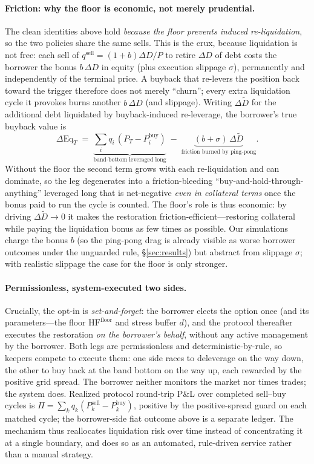\documentclass[12pt]{article}
\begin{document}
\paragraph{Friction: why the floor is economic, not merely prudential.} The clean identities above hold \emph{because the floor prevents induced re-liquidation}, so the two policies share the same sells. This is the crux, because liquidation is not free: each sell of $q^{\text{sell}}=(1+b)\Delta D/P$ to retire $\Delta D$ of debt costs the borrower the bonus $b\,\Delta D$ in equity (plus execution slippage $\sigma$), permanently and independently of the terminal price. A buyback that re-levers the position back toward the trigger therefore does not merely ``churn''; every extra liquidation cycle it provokes burns another $b\,\Delta D$ (and slippage). Writing $\Delta\widetilde D$ for the additional debt liquidated by buyback-induced re-leverage, the borrower's true buyback value is
\[
\Delta\mathrm{Eq}_T \;=\; \underbrace{\sum_i q_i\,(P_T-P_i^{\text{buy}})}_{\text{band-bottom leveraged long}} \;-\; \underbrace{(b+\sigma)\,\Delta\widetilde D}_{\text{friction burned by ping-pong}}.
\]
Without the floor the second term grows with each re-liquidation and can dominate, so the leg degenerates into a friction-bleeding ``buy-and-hold-through-anything'' leveraged long that is net-negative \emph{even in collateral terms} once the bonus paid to run the cycle is counted. The floor's role is thus economic: by driving $\Delta\widetilde D\to 0$ it makes the restoration friction-efficient---restoring collateral while paying the liquidation bonus as few times as possible. Our simulations charge the bonus $b$ (so the ping-pong drag is already visible as worse borrower outcomes under the unguarded rule, \S\ref{sec:results}) but abstract from slippage $\sigma$; with realistic slippage the case for the floor is only stronger.

\paragraph{Permissionless, system-executed two sides.} Crucially, the opt-in is \emph{set-and-forget}: the borrower elects the option once (and its parameters---the floor $\mathrm{HF}^{\text{floor}}$ and stress buffer $d$), and the protocol thereafter executes the restoration \emph{on the borrower's behalf}, without any active management by the borrower. Both legs are permissionless and deterministic-by-rule, so keepers compete to execute them: one side races to deleverage on the way down, the other to buy back at the band bottom on the way up, each rewarded by the positive grid spread. The borrower neither monitors the market nor times trades; the system does. Realized protocol round-trip P\&L over completed sell--buy cycles is $\Pi=\sum_k q_k(P_k^{\text{sell}}-P_k^{\text{buy}})$, positive by the positive-spread guard on each matched cycle; the borrower-side fiat outcome above is a separate ledger. The mechanism thus reallocates liquidation risk over time instead of concentrating it at a single boundary, and does so as an automated, rule-driven service rather than a manual strategy.
\end{document}
